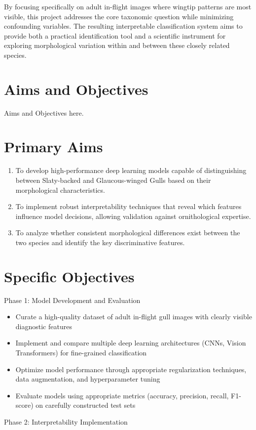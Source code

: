 By focusing specifically on adult in-flight images where wingtip patterns are most visible, this project addresses the core taxonomic question while minimizing confounding variables. The resulting interpretable classification system aims to provide both a practical identification tool and a scientific instrument for exploring morphological variation within and between these closely related species.




\section{Aims and Objectives}

Aims and Objectives here.



\section*{Primary Aims}
\begin{enumerate}
\item To develop high-performance deep learning models capable of distinguishing between Slaty-backed and Glaucous-winged Gulls based on their morphological characteristics.


\item To implement robust interpretability techniques that reveal which features influence model decisions, allowing validation against ornithological expertise.


\item To analyze whether consistent morphological differences exist between the two species and identify the key discriminative features.


\end{enumerate}
\section*{Specific Objectives}
Phase 1: Model Development and Evaluation

\begin{itemize}
\item Curate a high-quality dataset of adult in-flight gull images with clearly visible diagnostic features


\item Implement and compare multiple deep learning architectures (CNNs, Vision Transformers) for fine-grained classification


\item Optimize model performance through appropriate regularization techniques, data augmentation, and hyperparameter tuning


\item Evaluate models using appropriate metrics (accuracy, precision, recall, F1-score) on carefully constructed test sets


\end{itemize}
Phase 2: Interpretability Implementation

